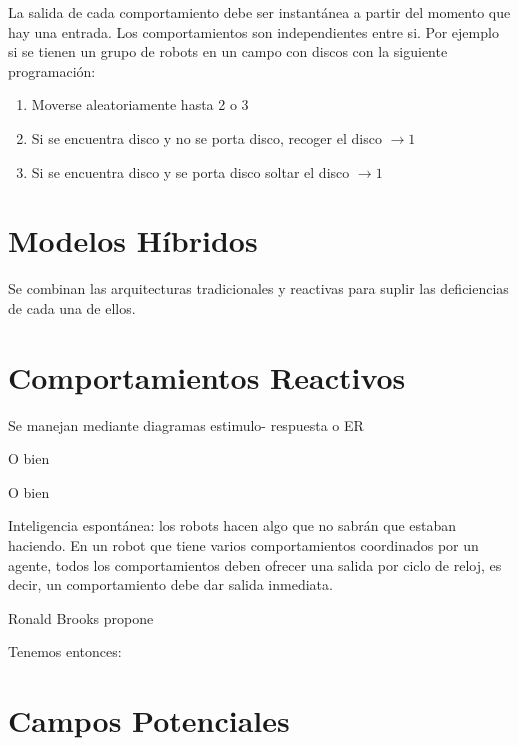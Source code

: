 
La salida de cada comportamiento debe ser instantánea a partir del momento que hay una entrada.
Los comportamientos son independientes entre si.
Por ejemplo si se tienen un grupo de robots en un campo con discos con la siguiente programación:

\begin{enumerate}
	\item Moverse aleatoriamente hasta 2 o 3 
	\item Si se encuentra disco y no se porta disco, recoger el disco $\rightarrow1$
	\item Si se encuentra disco y se porta disco soltar el disco $\rightarrow1$
\end{enumerate}







\section{Modelos Híbridos}

Se combinan las arquitecturas tradicionales y reactivas para suplir las deficiencias de cada una de ellos.





\section{Comportamientos Reactivos}

Se manejan mediante diagramas estimulo- respuesta o ER


O bien


O bien


Inteligencia espontánea: los robots hacen algo que no sabrán que estaban haciendo.
En un robot que tiene varios comportamientos coordinados por un agente, todos los comportamientos deben ofrecer una salida por ciclo de reloj, es decir, un comportamiento debe dar salida inmediata.


Ronald Brooks propone


Tenemos entonces:



\section{Campos Potenciales}

